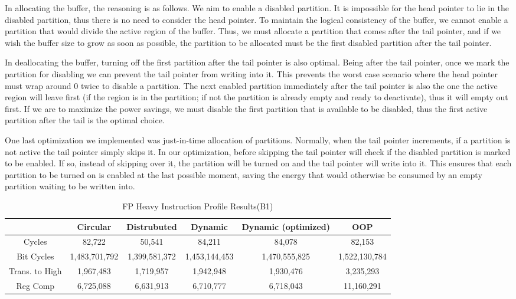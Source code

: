 In allocating the buffer, the reasoning is as follows. We aim to enable a disabled partition. It is impossible for the head pointer to lie in the disabled partition, thus there is no need to consider the head pointer. To maintain the logical consistency of the buffer, we cannot enable a partition that would divide the active region of the buffer. Thus, we must allocate a partition that comes after the tail pointer, and if we wish the buffer size to grow as soon as possible, the partition to be allocated must be the first disabled partition after the tail pointer.

In deallocating the buffer, turning off the first partition after the tail pointer is also optimal. Being after the tail pointer, once we mark the partition for disabling we can prevent the tail pointer from writing into it. This prevents the worst case scenario where the head pointer must wrap around 0 twice to disable a partition. The next enabled partition immediately after the tail pointer is also the one the active region will leave first (if the region is in the partition; if not the partition is already empty and ready to deactivate), thus it will empty out first. If we are to maximize the power savings, we must disable the first partition that is available to be disabled, thus the first active partition after the tail is the optimal choice.

One last optimization we implemented was just-in-time allocation of partitions. Normally, when the tail pointer increments, if a partition is not active the tail pointer simply skips it. In our optimization, before skipping the tail pointer will check if the disabled partition is marked to be enabled. If so, instead of skipping over it, the partition will be turned on and the tail pointer will write into it. This ensures that each partition to be turned on is enabled at the last possible moment, saving the energy that would otherwise be consumed by an empty partition waiting to be written into.

\begin{table*}[!tb]
\centering
\caption{FP Heavy Instruction Profile Results(B1)}
\begin{tabular}{|c|c|c|c|c|c|} \hline
    & Circular  & Distrubuted & Dynamic & Dynamic (optimized) & OOP\\ \hline
Cycles&82,722	&50,541&    	84,211	&84,078&        	82,153\\ \hline
Bit Cycles&1,483,701,792&	1,399,581,372&	1,453,144,453	&1,470,555,825	&1,522,130,784\\ \hline
Trans. to High&1,967,483&	1,719,957	&1,942,948	&1,930,476	&3,235,293\\ \hline
Reg Comp&6,725,088&	6,631,913&	6,710,777&	6,718,043	&11,160,291\\ \hline
\end{tabular}
\end{table*}

